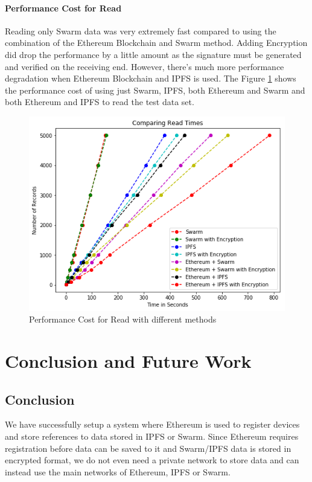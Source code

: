 \documentclass[11pt,openright]{report}
\begin{document}
\subsubsection{Performance Cost for Read}
Reading only Swarm data was very extremely fast compared to using the combination of the Ethereum Blockchain and Swarm method. Adding Encryption did drop the performance by a little amount as the signature must be generated and verified on the receiving end. However, there's much more performance degradation when Ethereum Blockchain and IPFS is used. The Figure \ref{fig:graph_perf_cost_read} shows the performance cost of using just Swarm, IPFS, both Ethereum and Swarm and both Ethereum and IPFS to read the test data set.

\begin{figure}
	\centering
	\includegraphics[scale=1]{results/Eth_IPFS_Swarm_Read.png}
	\caption{Performance Cost for Read with different methods}
	\label{fig:graph_perf_cost_read}
\end{figure}

\chapter{Conclusion and Future Work} \label{chapter:conclusion}
\section{Conclusion}
We have successfully setup a system where Ethereum is used to register devices and store references to data stored in IPFS or Swarm. Since Ethereum requires registration before data can be saved to it and Swarm/IPFS data is stored in encrypted format, we do not even need a private network to store data and can instead use the main networks of Ethereum, IPFS or Swarm.
\end{document}
